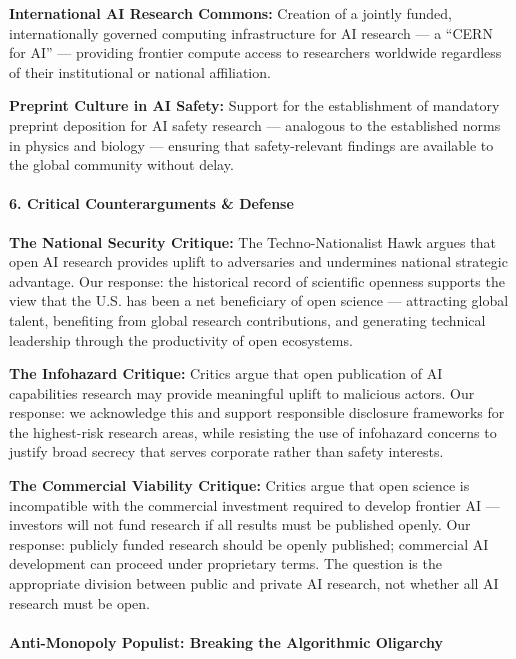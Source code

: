 \textbf{International AI Research Commons:} Creation of a jointly
funded, internationally governed computing infrastructure for AI
research --- a ``CERN for AI'' --- providing frontier compute access to
researchers worldwide regardless of their institutional or national
affiliation.

\textbf{Preprint Culture in AI Safety:} Support for the establishment of
mandatory preprint deposition for AI safety research --- analogous to
the established norms in physics and biology --- ensuring that
safety-relevant findings are available to the global community without
delay.

\paragraph{6. Critical Counterarguments \&
Defense}\label{critical-counterarguments-defense-27}

\textbf{The National Security Critique:} The Techno-Nationalist Hawk
argues that open AI research provides uplift to adversaries and
undermines national strategic advantage. Our response: the historical
record of scientific openness supports the view that the U.S. has been a
net beneficiary of open science --- attracting global talent, benefiting
from global research contributions, and generating technical leadership
through the productivity of open ecosystems.

\textbf{The Infohazard Critique:} Critics argue that open publication of
AI capabilities research may provide meaningful uplift to malicious
actors. Our response: we acknowledge this and support responsible
disclosure frameworks for the highest-risk research areas, while
resisting the use of infohazard concerns to justify broad secrecy that
serves corporate rather than safety interests.

\textbf{The Commercial Viability Critique:} Critics argue that open
science is incompatible with the commercial investment required to
develop frontier AI --- investors will not fund research if all results
must be published openly. Our response: publicly funded research should
be openly published; commercial AI development can proceed under
proprietary terms. The question is the appropriate division between
public and private AI research, not whether all AI research must be
open.

\paragraph{Anti-Monopoly Populist: Breaking the Algorithmic
Oligarchy}\label{anti-monopoly-populist-breaking-the-algorithmic-oligarchy}

